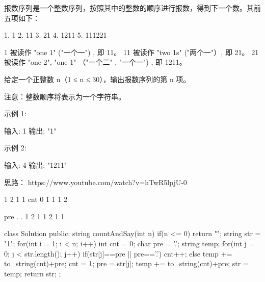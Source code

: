 报数序列是一个整数序列，按照其中的整数的顺序进行报数，得到下一个数。其前五项如下：

1.     1
2.     11
3.     21
4.     1211
5.     111221

1 被读作  "one 1"  ("一个一") , 即 11。
11 被读作 "two 1s" ("两个一"）, 即 21。
21 被读作 "one 2",  "one 1" （"一个二" ,  "一个一") , 即 1211。

给定一个正整数 n（1 ≤ n ≤ 30），输出报数序列的第 n 项。

注意：整数顺序将表示为一个字符串。

 

示例 1:

输入: 1
输出: "1"

示例 2:

输入: 4
输出: "1211"































思路：
https://www.youtube.com/watch?v=hTwR5lpjU-0

			1	2	1	1
cnt 		0	1	1	1	2

pre		.	.	1	2	1
			1	2	1	1


































class Solution {
public:
    string countAndSay(int n) {
        if(n <= 0) return "";
        string str = "1";
        for(int i = 1; i < n; i++)
        {
            int cnt = 0;
            char pre = '.';
            string temp;
            for(int j = 0; j < str.length(); j++)
            {
                if(str[j]==pre || pre=='.') cnt++;
                else
                {
                    temp += to_string(cnt)+pre;
                    cnt = 1;
                }
                pre = str[j];
            }
            temp += to_string(cnt)+pre;
            str = temp;
        }
        return str;
    }
};